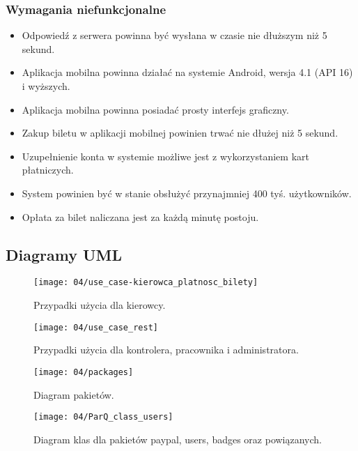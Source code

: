 \subsubsection*{Wymagania niefunkcjonalne}

\begin{itemize}
	\item Odpowiedź z serwera powinna być wysłana w czasie nie dłuższym niż 5 sekund.
	\item Aplikacja mobilna powinna działać na systemie Android, wersja 4.1 (API 16) i wyższych.
	\item Aplikacja mobilna powinna posiadać prosty interfejs graficzny.
	\item Zakup biletu w aplikacji mobilnej powinien trwać nie dłużej niż 5 sekund.
	\item Uzupełnienie konta w systemie możliwe jest z wykorzystaniem kart płatniczych.
	\item System powinien być w stanie obsłużyć przynajmniej 400 tyś. użytkowników.
	\item Opłata za bilet naliczana jest za każdą minutę postoju.
\end{itemize}

\newpage
\subsection{Diagramy UML}

\begin{figure}[h]
	\begin{center}
		\texttt{[image: 04/use\_case-kierowca\_platnosc\_bilety]}
	\end{center}
	\caption{Przypadki użycia dla kierowcy.}
\end{figure}

\begin{figure}[p]
	\begin{center}
		\texttt{[image: 04/use\_case\_rest]}
	\end{center}
	\caption{Przypadki użycia dla kontrolera, pracownika i administratora.}
\end{figure}

\begin{figure}[p]
	\begin{center}
		\texttt{[image: 04/packages]}
	\end{center}
	\caption{Diagram pakietów.}
\end{figure}

\begin{figure}[p]
	\begin{center}
		\texttt{[image: 04/ParQ\_class\_users]}
	\end{center}
	\caption{Diagram klas dla pakietów paypal, users, badges oraz powiązanych.}
\end{figure}

